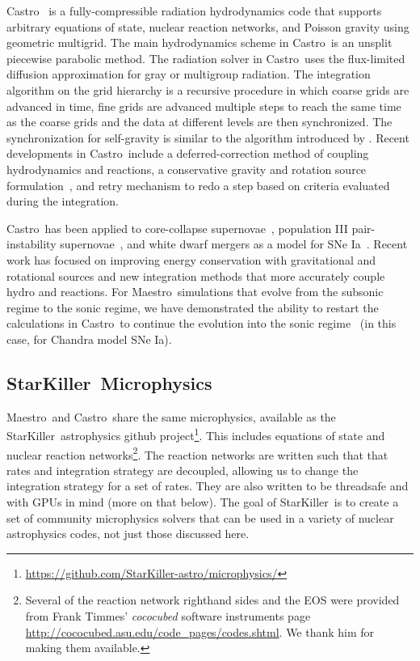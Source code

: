 \documentclass[a4paper]{jpconf}
\newcommand{\maestro}{{\sffamily Maestro}}
\newcommand{\castro}{{\sffamily Castro}}
\newcommand{\starkiller}{{\sffamily StarKiller}}
\newcommand{\MarginPar}[1]{\marginpar{\vskip-\baselineskip\raggedright\tiny\sffamily\hrule\smallskip{\color{red}#1}\par\smallskip\hrule}}
\begin{document}
\castro~\cite{castro,castroII,castroIII} is a fully-compressible
radiation hydrodynamics code that supports arbitrary equations of
state, nuclear reaction networks, and Poisson gravity using geometric
multigrid.  The main hydrodynamics scheme in \castro\ is an unsplit
piecewise parabolic method.  The radiation solver in \castro\ uses the
flux-limited diffusion approximation for gray or multigroup radiation.
The integration algorithm on the grid hierarchy is a recursive
procedure in which coarse grids are advanced in time, fine grids are
advanced multiple steps to reach the same time as the coarse grids and
the data at different levels are then synchronized. The
synchronization for self-gravity is similar to the algorithm
introduced by \cite{miniati-colella}.  Recent developments in
\castro\ include a deferred-correction method of coupling
hydrodynamics and reactions, a conservative gravity and rotation
source formulation~\cite{wdmergerI}, and retry mechanism to redo a
step based on criteria evaluated during the integration.\MarginPar{more new stuff?}

\castro\ has been applied to core-collapse
supernovae~\cite{castro-ccsne}, population III pair-instability
supernovae~\cite{castro-pairinstability}, and white dwarf mergers as a
model for SNe Ia~\cite{wdmergerI}.  Recent work has focused on
improving energy conservation with gravitational and rotational
sources and new integration methods that more accurately couple hydro
and reactions.  For \maestro\ simulations that evolve from the
subsonic regime to the sonic regime, we have demonstrated the ability
to restart the calculations in \castro\ to continue the evolution into
the sonic regime~\cite{scidac-petascale,malone:2014} (in this case,
for Chandra model SNe Ia).

\subsection{\starkiller\ Microphysics}

\maestro\ and \castro\ share the same microphysics, available as the
\starkiller\ astrophysics github
project\footnote{\url{https://github.com/StarKiller-astro/microphysics/}}.
This includes equations of state and nuclear reaction
networks\footnote{Several of the reaction network righthand sides and
  the EOS were provided from Frank Timmes' {\em cococubed} software
  instruments page
  \url{http://cococubed.asu.edu/code_pages/codes.shtml}.  We thank him
  for making them available.}.  The reaction networks are written such
that that rates and integration strategy are decoupled, allowing us to
change the integration strategy for a set of rates.  They are also
written to be threadsafe and with GPUs in mind (more on that below).
The goal of \starkiller\ is to create a set of community microphysics
solvers that can be used in a variety of nuclear astrophysics codes,
not just those discussed here.
\end{document}
